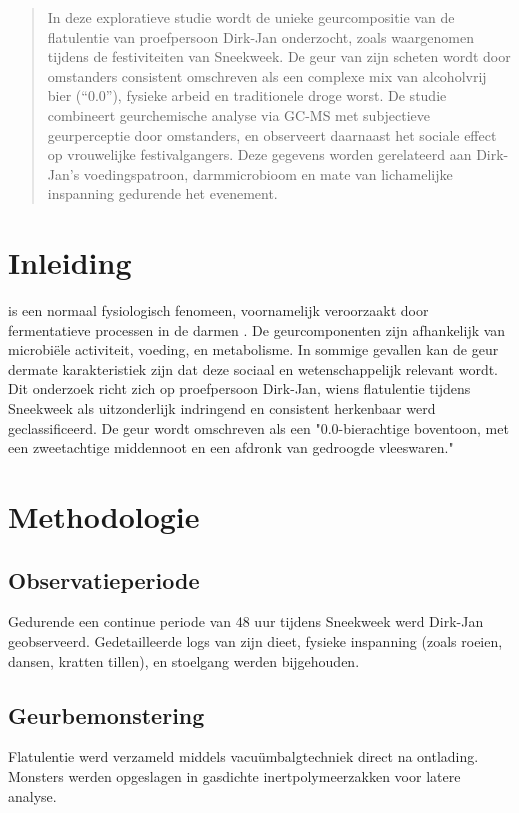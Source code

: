 \documentclass{BK5}
\author{ing. Florent Kegler}
\date{\today}
\begin{document}
	\maketitle
	
	\begin{abstract}
		In deze exploratieve studie wordt de unieke geurcompositie van de flatulentie van proefpersoon Dirk-Jan onderzocht, zoals waargenomen tijdens de festiviteiten van Sneekweek. De geur van zijn scheten wordt door omstanders consistent omschreven als een complexe mix van alcoholvrij bier (“0.0”), fysieke arbeid en traditionele droge worst. De studie combineert geurchemische analyse via GC-MS met subjectieve geurperceptie door omstanders, en observeert daarnaast het sociale effect op vrouwelijke festivalgangers. Deze gegevens worden gerelateerd aan Dirk-Jan’s voedingspatroon, darmmicrobioom en mate van lichamelijke inspanning gedurende het evenement.
	\end{abstract}
	
	\section{Inleiding}
	 is een normaal fysiologisch fenomeen, voornamelijk veroorzaakt door fermentatieve processen in de darmen \cite{smith2013intestinal}. De geurcomponenten zijn afhankelijk van microbiële activiteit, voeding, en metabolisme. In sommige gevallen kan de geur dermate karakteristiek zijn dat deze sociaal en wetenschappelijk relevant wordt. Dit onderzoek richt zich op proefpersoon Dirk-Jan, wiens flatulentie tijdens Sneekweek als uitzonderlijk indringend en consistent herkenbaar werd geclassificeerd. De geur wordt omschreven als een "0.0-bierachtige boventoon, met een zweetachtige middennoot en een afdronk van gedroogde vleeswaren."
	
	\section{Methodologie}
	\subsection{Observatieperiode}
	Gedurende een continue periode van 48 uur tijdens Sneekweek werd Dirk-Jan geobserveerd. Gedetailleerde logs van zijn dieet, fysieke inspanning (zoals roeien, dansen, kratten tillen), en stoelgang werden bijgehouden.
	
	\subsection{Geurbemonstering}
	Flatulentie werd verzameld middels vacuümbalgtechniek direct na ontlading. Monsters werden opgeslagen in gasdichte inertpolymeerzakken voor latere analyse.
	
\end{document}
